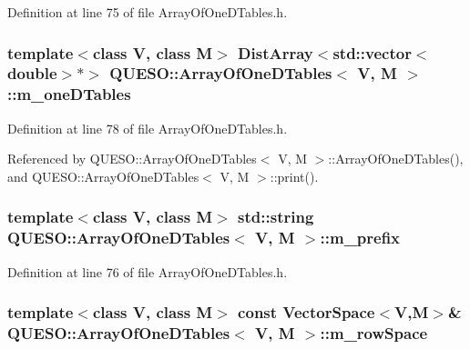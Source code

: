 Definition at line 75 of file Array\-Of\-One\-D\-Tables.\-h.

\hypertarget{class_q_u_e_s_o_1_1_array_of_one_d_tables_ad5e13befcb2e58dde1c13e396388a696}{
\subsubsection[{m\-\_\-one\-D\-Tables}]{\setlength{\rightskip}{0pt plus 5cm}template$<$class V, class M$>$ {\bf Dist\-Array}$<$std\-::vector$<$double$>$$\ast$$>$ {\bf Q\-U\-E\-S\-O\-::\-Array\-Of\-One\-D\-Tables}$<$ V, M $>$\-::m\-\_\-one\-D\-Tables\hspace{0.3cm}{\ttfamily [private]}}}\label{class_q_u_e_s_o_1_1_array_of_one_d_tables_ad5e13befcb2e58dde1c13e396388a696}


Definition at line 78 of file Array\-Of\-One\-D\-Tables.\-h.



Referenced by Q\-U\-E\-S\-O\-::\-Array\-Of\-One\-D\-Tables$<$ V, M $>$\-::\-Array\-Of\-One\-D\-Tables(), and Q\-U\-E\-S\-O\-::\-Array\-Of\-One\-D\-Tables$<$ V, M $>$\-::print().

\hypertarget{class_q_u_e_s_o_1_1_array_of_one_d_tables_ae9bfd81e226ee5712cd160031f96d4d2}{
\subsubsection[{m\-\_\-prefix}]{\setlength{\rightskip}{0pt plus 5cm}template$<$class V, class M$>$ std\-::string {\bf Q\-U\-E\-S\-O\-::\-Array\-Of\-One\-D\-Tables}$<$ V, M $>$\-::m\-\_\-prefix\hspace{0.3cm}{\ttfamily [private]}}}\label{class_q_u_e_s_o_1_1_array_of_one_d_tables_ae9bfd81e226ee5712cd160031f96d4d2}


Definition at line 76 of file Array\-Of\-One\-D\-Tables.\-h.

\hypertarget{class_q_u_e_s_o_1_1_array_of_one_d_tables_a476632866ae0eebc389f19b8b83cc324}{
\subsubsection[{m\-\_\-row\-Space}]{\setlength{\rightskip}{0pt plus 5cm}template$<$class V, class M$>$ const {\bf Vector\-Space}$<$V,M$>$\& {\bf Q\-U\-E\-S\-O\-::\-Array\-Of\-One\-D\-Tables}$<$ V, M $>$\-::m\-\_\-row\-Space\hspace{0.3cm}{\ttfamily [private]}}}\label{class_q_u_e_s_o_1_1_array_of_one_d_tables_a476632866ae0eebc389f19b8b83cc324}



